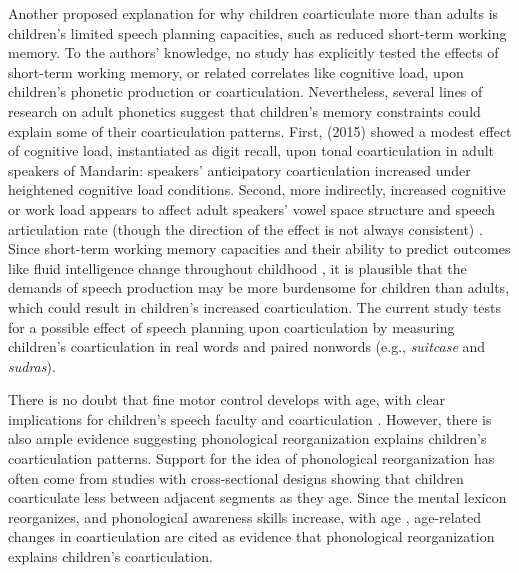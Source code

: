 \documentclass[a4paper,man,natbib,donotrepeattitle, apacite]{apa6}
\begin{document}
Another proposed explanation for why children coarticulate more than adults is children's limited speech planning capacities, such as reduced short-term working memory. To the authors' knowledge, no study has explicitly tested the effects of short-term working memory, or related correlates like cognitive load, upon children's phonetic production or coarticulation. Nevertheless, several lines of research on adult phonetics suggest that children's memory constraints could explain some of their coarticulation patterns. First, \citeauthor{franichEffectCognitiveLoad2015} (2015) showed a modest effect of cognitive load, instantiated as digit recall, upon tonal coarticulation in adult speakers of Mandarin: speakers' anticipatory coarticulation increased under heightened cognitive load conditions. Second, more indirectly, increased cognitive or work load appears to affect adult speakers' vowel space structure and speech articulation rate (though the direction of the effect is not always consistent) \cite{huttunenEffectCognitiveLoad2011,livelyEffectsCognitiveWorkload1993}. Since short-term working memory capacities and their ability to predict outcomes like fluid intelligence change throughout childhood \cite{engeldeabreuWorkingMemoryFluid2010,hitchWorkingMemoryChildren1983}, it is plausible that the demands of speech production may be more burdensome for children than adults, which could result in children's increased coarticulation. The current study tests for a possible effect of speech planning upon coarticulation by measuring children's coarticulation in real words and paired nonwords (e.g., \textit{suitcase} and \textit{sudras}).

There is no doubt that fine motor control develops with age, with clear implications for children’s speech faculty and coarticulation \cite{barbierWhatAnticipatoryCoarticulation2020,zharkovaDynamicsVoicelessSibilant2018}. However, there is also ample evidence suggesting phonological reorganization explains children's coarticulation patterns. Support for the idea of phonological reorganization has often come from studies with cross-sectional designs showing that children coarticulate less between adjacent segments as they age. Since the mental lexicon reorganizes, and phonological awareness skills increase, with age \cite{metsalaYoungChildrenPhonological1999,storkelInfluencePartwordPhonotactic2011}, age-related changes in coarticulation are cited as evidence that phonological reorganization explains children's coarticulation. 
\end{document}
